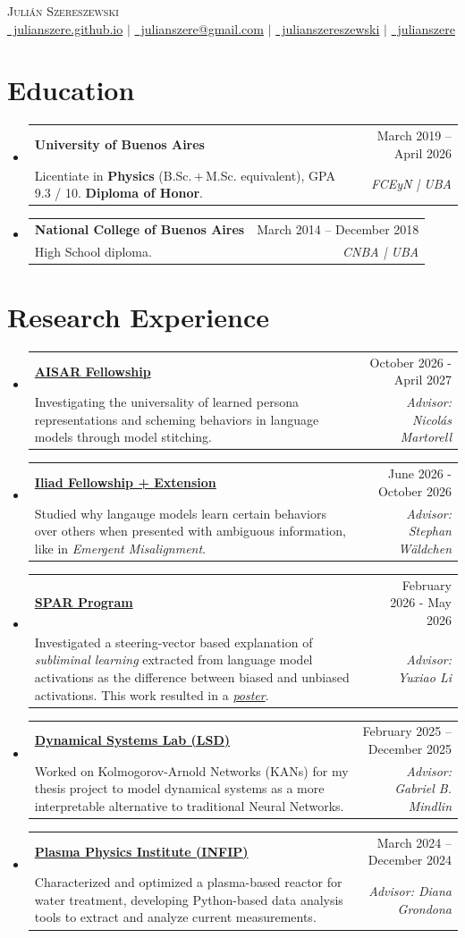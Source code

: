 \documentclass[letterpaper,11pt]{article}
\makeatletter
\newcommand{\resumeItem}[4]{
  \vspace{-2pt}\item
    \begin{tabular*}{\textwidth}[t]{l@{\extracolsep{\fill}}r}
      \textbf{#1} & #2 \\
      {\parbox[t]{0.7\textwidth}{\small#3}} & \textit{\small \textcolor{mygray}{#4}} \\
    \end{tabular*}\vspace{-7pt}
}
\newcommand{\resumeSectionStart}{\begin{itemize}[leftmargin=0pt, label={}]}
\newcommand{\resumeSectionEnd}{\end{itemize}}
\makeatother
\begin{document}
\begin{center}
    {\Huge \scshape Julián Szereszewski} \\ \vspace{2pt}
    \href{https://julianszere.github.io/}{\faGlobe\ julianszere.github.io} $|$
    \href{mailto:julianszere@gmail.com}{\Letter\ julianszere@gmail.com} $|$
    \href{https://www.linkedin.com/in/julianszereszewski/?locale=en-US}{\faLinkedin\ julianszereszewski} $|$
    \href{https://github.com/julianszere}{\faGithub\ julianszere}
\end{center}


\section{Education}
  \resumeSectionStart
    \resumeItem
      {University of Buenos Aires}
      {March 2019 -- April 2026}
      {Licentiate in \textbf{Physics} (B.Sc.\,+\,M.Sc. equivalent), GPA 9.3 / 10. \textbf{Diploma of Honor}.}
      {FCEyN | UBA}
    \resumeItem
      {National College of Buenos Aires}
      {March 2014 -- December 2018}
      {High School diploma.}
      {CNBA | UBA}
  \resumeSectionEnd

\section{Research Experience}
  \resumeSectionStart
    \resumeItem
      {\href{https://scholarship.aisafety.ar/}{AISAR Fellowship}}
      {October 2026 - April 2027}
      {Investigating the universality of learned persona representations and scheming behaviors in language models through model stitching.}
      {Advisor: Nicolás Martorell}
    \resumeItem
      {\href{https://www.iliad.ac/fellowship}{Iliad Fellowship + Extension}}
      {June 2026 - October 2026}
      {Studied why langauge models learn certain behaviors over others when presented with ambiguous information, like in \textit{Emergent Misalignment}.}
      {Advisor: Stephan Wäldchen}
    \resumeItem
      {\href{https://www.sparai.org/}{SPAR Program}}
      {February 2026 - May 2026}
      {Investigated a steering-vector based explanation of \textit{subliminal learning} extracted from language model activations as the difference between biased and unbiased activations. This work resulted in a \textit{\href{https://julianszere.github.io/curriculum/posters/subliminal.pdf}{poster}}.}
      {Advisor: Yuxiao Li}
    \resumeItem
      {\href{http://www.lsd.df.uba.ar/materias/}{Dynamical Systems Lab (LSD)}}
      {February 2025 -- December 2025}
      {Worked on Kolmogorov-Arnold Networks (KANs) for my thesis project to model dynamical systems as a more interpretable alternative to traditional Neural Networks.}
      {Advisor: Gabriel B. Mindlin}
    \resumeItem
      {\href{https://www.df.uba.ar/es/7-novedades/8492-infina-el-nuevo-instituto-de-investigacion-de-fisica}{Plasma Physics Institute (INFIP)}}
      {March 2024 -- December 2024}
      {Characterized and optimized a plasma-based reactor for water treatment, developing Python-based data analysis tools to extract and analyze current measurements.}
      {Advisor: Diana Grondona}
  \resumeSectionEnd
\end{document}
